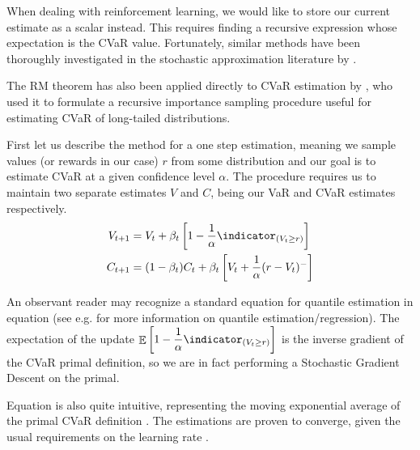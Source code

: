 When dealing with reinforcement learning, we would like to store our current estimate as a scalar instead. This requires finding a recursive expression whose expectation is the CVaR value. Fortunately, similar methods have been thoroughly investigated in the stochastic approximation literature by \citet{robbins1951stochastic}.

The RM theorem has also been applied directly to CVaR estimation by \citet{bardou2009recursive}, who used it to formulate a recursive importance sampling procedure useful for estimating CVaR of long-tailed distributions.

First let us describe the method for a one step estimation, meaning we sample values (or rewards in our case) $r$ from some distribution and our goal is to estimate CVaR at a given confidence level $\alpha$. The procedure requires us to maintain two separate estimates $V$ and $C$, being our VaR and CVaR estimates respectively.
\begin{align}
V_{t+1} &= V_{t} + \beta_t \bsquare{1-\dfrac{1}{\alpha}\indicator_{(V_t \ge r)}}\label{eqn:varestimate}\\
C_{t+1} &= (1-\beta_t)C_t + \beta_t \bsquare{V_t + \dfrac{1}{\alpha}(r-V_t)^-}\label{eqn:cvarestimate}
\end{align}

An observant reader may recognize a standard equation for quantile estimation in equation  (see e.g. \citet{koenker2001quantile} for more information on quantile estimation/regression). The expectation of the update $\expect\bsquare{1-\dfrac{1}{\alpha}\indicator_{(V_t \ge r)}}$ is the inverse gradient of the CVaR primal definition, so we are in fact performing a Stochastic Gradient Descent on the primal.

Equation  is also quite intuitive, representing the moving exponential average of the primal CVaR definition . The estimations are proven to converge, given the usual requirements on the learning rate  \citep{bardou2009recursive}.


